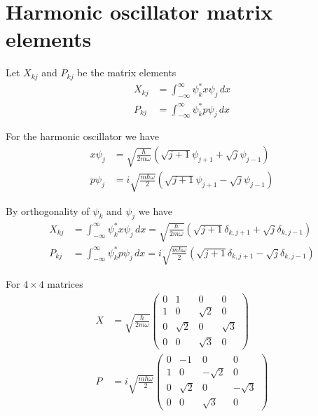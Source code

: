 


\section*{Harmonic oscillator matrix elements}

Let $X_{kj}$ and $P_{kj}$ be the matrix elements
\begin{align*}
X_{kj}&=\int_{-\infty}^\infty \psi_k^*x\psi_j\,dx
\\[1ex]
P_{kj}&=\int_{-\infty}^\infty \psi_k^*p\psi_j\,dx
\end{align*}

For the harmonic oscillator we have
\begin{align*}
x\psi_j&=\sqrt{\frac{\hbar}{2m\omega}}\left(\sqrt{j+1}\psi_{j+1}+\sqrt j\psi_{j-1}\right)
\\[1ex]
p\psi_j&=i\sqrt{\frac{m\hbar\omega}{2}}\left(\sqrt{j+1}\psi_{j+1}-\sqrt j\psi_{j-1}\right)
\end{align*}

By orthogonality of $\psi_k$ and $\psi_j$ we have
\begin{align*}
X_{kj}&=\int_{-\infty}^\infty \psi_k^*x\psi_j\,dx
=\sqrt{\frac{\hbar}{2m\omega}}\left(\sqrt{j+1}\delta_{k,j+1}+\sqrt j\delta_{k,j-1}\right)
\\[1ex]
P_{kj}&=\int_{-\infty}^\infty \psi_k^*p\psi_j\,dx
=i\sqrt{\frac{m\hbar\omega}{2}}\left(\sqrt{j+1}\delta_{k,j+1}-\sqrt j\delta_{k,j-1}\right)
\end{align*}

For $4\times4$ matrices
\begin{align*}
X&=\sqrt{\frac{\hbar}{2m\omega}}
\begin{pmatrix}
0 & 1 & 0 & 0
\\
1 & 0 & \sqrt{2} & 0
\\
0 & \sqrt{2} & 0 & \sqrt{3}
\\
0 & 0 & \sqrt{3} & 0
\end{pmatrix}
\\[1ex]
P&=i\sqrt{\frac{m\hbar\omega}{2}}
\begin{pmatrix}
0 & -1 & 0 & 0
\\
1 & 0 & -\sqrt{2} & 0
\\
0 & \sqrt{2} & 0 & -\sqrt{3}
\\
0 & 0 & \sqrt{3} & 0
\end{pmatrix}
\end{align*}

